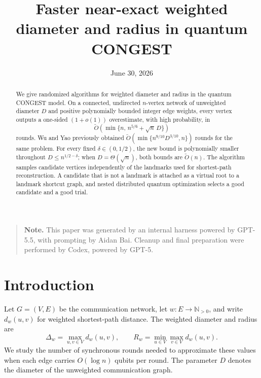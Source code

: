\documentclass[11pt]{article}
\title{Faster near-exact weighted diameter and radius in quantum CONGEST}
\author{}
\date{June 30, 2026}
\theoremstyle{definition}
\newcommand{\dist}{d_w}
\newcommand{\diamw}{\Delta_w}
\newcommand{\radw}{R_w}
\newcommand{\wtO}{\widetilde O}
\begin{document}
\maketitle

\begin{abstract}
We give randomized algorithms for weighted diameter and radius in the quantum
CONGEST model.  On a connected, undirected $n$-vertex network of unweighted
diameter $D$ and positive polynomially bounded integer edge weights, every
vertex outputs a one-sided $(1+o(1))$ overestimate, with high probability, in
\[
  \wtO\!\left(\min\{n,\,n^{5/6}+\sqrt n\,D\}\right)
\]
rounds.  Wu and Yao previously obtained
$\wtO(\min\{n^{9/10}D^{3/10},n\})$ rounds for the same problem.  For every
fixed $\delta\in(0,1/2)$, the new bound is polynomially smaller throughout
$D\leq n^{1/2-\delta}$; when $D=\Theta(\sqrt n)$, both bounds are
$\wtO(n)$.  The algorithm samples
candidate vertices independently of the landmarks used for shortest-path
reconstruction.  A candidate that is not a landmark is attached as a virtual
root to a landmark shortcut graph, and nested distributed quantum optimization
selects a good candidate and a good trial.
\end{abstract}

\begin{quote}
\small\noindent\textbf{Note.} This paper was generated by an internal harness
powered by GPT-5.5, with prompting by Aidan Bai. Cleanup and final preparation
were performed by Codex, powered by GPT-5.
\end{quote}

\section{Introduction}

Let $G=(V,E)$ be the communication network, let $w:E\to\mathbb N_{>0}$,
and write $\dist(u,v)$ for weighted shortest-path distance.  The weighted
diameter and radius are
\[
  \diamw=\max_{u,v\in V}\dist(u,v),
  \qquad
  \radw=\min_{u\in V}\max_{v\in V}\dist(u,v).
\]
We study the number of synchronous rounds needed to approximate these values
when each edge carries $O(\log n)$ qubits per round.  The parameter $D$ denotes
the diameter of the unweighted communication graph.
\end{document}
